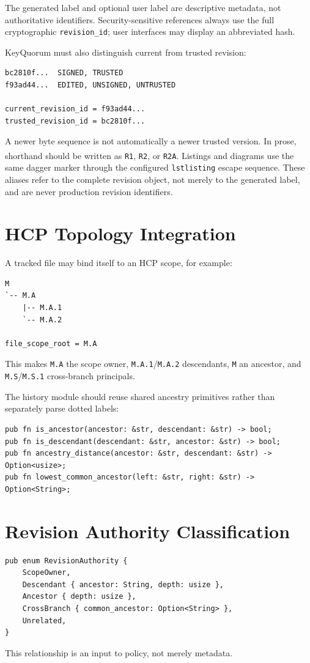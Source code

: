 \documentclass[11pt]{article}
\newcommand{\revshort}[1]{\texttt{#1}\textsuperscript{\textcolor{revisionnote}{\dag}}}
\begin{document}
The generated label and optional user label are descriptive metadata, not authoritative identifiers. Security-sensitive references always use the full cryptographic \texttt{revision\_id}; user interfaces may display an abbreviated hash.

KeyQuorum must also distinguish current from trusted revision:

\begin{lstlisting}
bc2810f...  SIGNED, TRUSTED
f93ad44...  EDITED, UNSIGNED, UNTRUSTED

current_revision_id = f93ad44...
trusted_revision_id = bc2810f...
\end{lstlisting}

A newer byte sequence is not automatically a newer trusted version. In prose, shorthand should be written as \revshort{R1}, \revshort{R2}, or \revshort{R2A}. Listings and diagrams use the same dagger marker through the configured \texttt{lstlisting} escape sequence. These aliases refer to the complete revision object, not merely to the generated label, and are never production revision identifiers.

\section{HCP Topology Integration}
A tracked file may bind itself to an HCP scope, for example:
\begin{lstlisting}
M
`-- M.A
    |-- M.A.1
    `-- M.A.2

file_scope_root = M.A
\end{lstlisting}
This makes \texttt{M.A} the scope owner, \texttt{M.A.1}/\texttt{M.A.2} descendants, \texttt{M} an ancestor, and \texttt{M.S}/\texttt{M.S.1} cross-branch principals.

The history module should reuse shared ancestry primitives rather than separately parse dotted labels:
\begin{lstlisting}
pub fn is_ancestor(ancestor: &str, descendant: &str) -> bool;
pub fn is_descendant(descendant: &str, ancestor: &str) -> bool;
pub fn ancestry_distance(ancestor: &str, descendant: &str) -> Option<usize>;
pub fn lowest_common_ancestor(left: &str, right: &str) -> Option<String>;
\end{lstlisting}

\section{Revision Authority Classification}
\begin{lstlisting}
pub enum RevisionAuthority {
    ScopeOwner,
    Descendant { ancestor: String, depth: usize },
    Ancestor { depth: usize },
    CrossBranch { common_ancestor: Option<String> },
    Unrelated,
}
\end{lstlisting}
This relationship is an input to policy, not merely metadata.
\end{document}
